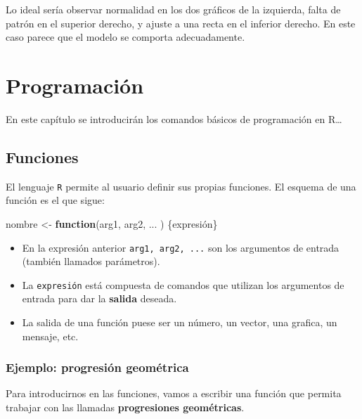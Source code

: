 \documentclass[
]{book}
\newenvironment{Shaded}{\begin{snugshade}}{\end{snugshade}}
\newcommand{\ControlFlowTok}[1]{\textcolor[rgb]{0.13,0.29,0.53}{\textbf{#1}}}
\newcommand{\NormalTok}[1]{#1}
\newcommand{\OtherTok}[1]{\textcolor[rgb]{0.56,0.35,0.01}{#1}}
\theoremstyle{break}
\theoremstyle{nonumberplain}
\begin{document}
Lo ideal sería observar normalidad en los dos gráficos de la izquierda, falta de patrón en el superior derecho, y ajuste a una recta en el inferior derecho. En este caso parece que el modelo se comporta adecuadamente.

\hypertarget{programacion}{%
\chapter{Programación}\label{programacion}}

En este capítulo se introducirán los comandos básicos de programación en R\ldots{}

\hypertarget{funciones}{%
\section{Funciones}\label{funciones}}

El lenguaje \texttt{R} permite al usuario
definir sus propias funciones. El esquema de una función es el que
sigue:

\begin{Shaded}
\begin{Highlighting}[]
\NormalTok{nombre }\OtherTok{\textless{}{-}} \ControlFlowTok{function}\NormalTok{(arg1, arg2, ... ) \{expresión\}}
\end{Highlighting}
\end{Shaded}

\begin{itemize}
\item
  En la expresión anterior \texttt{arg1,\ arg2,\ ...} son los
  argumentos de entrada (también llamados parámetros).
\item
  La \texttt{expresión} está compuesta de comandos que utilizan los
  argumentos de entrada para dar la \textbf{salida} deseada.
\item
  La salida de una función puese ser un número, un vector, una
  grafica, un mensaje, etc.
\end{itemize}

\hypertarget{ejemplo-progresiuxf3n-geomuxe9trica}{%
\subsection{Ejemplo: progresión geométrica}\label{ejemplo-progresiuxf3n-geomuxe9trica}}

Para introducirnos en las
funciones, vamos a escribir una función que permita trabajar con las
llamadas \textbf{progresiones geométricas}.
\end{document}
